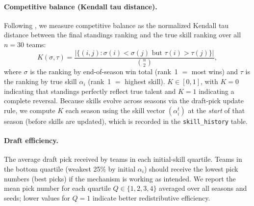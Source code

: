 \paragraph{Competitive balance (Kendall tau distance).}
Following \citet{kazachkov2020}, we measure competitive balance as the
normalized Kendall tau distance between the final standings ranking and the
true skill ranking over all $n = 30$ teams:
\[
    K(\sigma, \tau)
    = \frac{\bigl|\{(i,j) : \sigma(i) < \sigma(j)
                  \text{ but } \tau(i) > \tau(j)\}\bigr|}{\binom{n}{2}},
\]
where $\sigma$ is the ranking by end-of-season win total (rank~1 $=$ most wins)
and $\tau$ is the ranking by true skill $\alpha_i$ (rank~1 $=$ highest skill).
$K \in [0,1]$, with $K = 0$ indicating that standings perfectly reflect true
talent and $K = 1$ indicating a complete reversal.
Because skills evolve across seasons via the draft-pick update rule, we compute
$K$ each season using the skill vector $(\alpha_i^t)$ at the \emph{start} of
that season (before skills are updated), which is recorded in the
\texttt{skill\_history} table.

\paragraph{Draft efficiency.}
The average draft pick received by teams in each initial-skill quartile.
Teams in the bottom quartile (weakest 25\% by initial $\alpha_i$) should
receive the lowest pick numbers (best picks) if the mechanism is working as
intended.
We report the mean pick number for each quartile $Q \in \{1, 2, 3, 4\}$
averaged over all seasons and seeds; lower values for $Q = 1$ indicate better
redistributive efficiency.